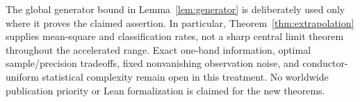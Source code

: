 The global generator bound in Lemma~\ref{lem:generator} is deliberately
used only where it proves the claimed assertion.  In particular,
Theorem~\ref{thm:extrapolation} supplies mean-square and classification
rates, not a sharp central limit theorem throughout the accelerated
range.  Exact one-band information, optimal sample/precision tradeoffs,
fixed nonvanishing observation noise, and conductor-uniform statistical
complexity remain open in this treatment.  No worldwide publication
priority or Lean formalization is claimed for the new theorems.
